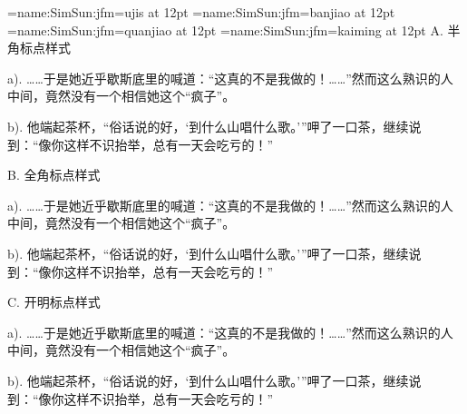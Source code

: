 
\jfont\fmdisplay={name:SimSun:jfm=ujis} at 12pt
\jfont\banjiao={name:SimSun:jfm=banjiao} at 12pt
\jfont\quanjiao={name:SimSun:jfm=quanjiao} at 12pt
\jfont\kaiming={name:SimSun:jfm=kaiming} at 12pt
\def\texta{a). ……于是她近乎歇斯底里的喊道：“这真的不是我做的！……”然而这么熟识的人中间，竟然没有一个相信她这个“疯子”。}
\def\textb{b). 他端起茶杯，“俗话说的好，‘到什么山唱什么歌。’”呷了一口茶，继续说到：“像你这样不识抬举，总有一天会吃亏的！”}
\fmdisplay
\beginsection A. 半角标点样式

\smallskip
{\banjiao\texta\par\textb}
\beginsection B. 全角标点样式

\smallskip
{\quanjiao\texta\par\textb}
\beginsection C. 开明标点样式

\smallskip
{\kaiming\texta\par\textb}
\bye